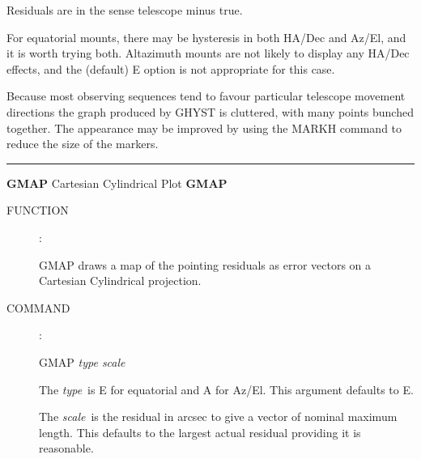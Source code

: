 \begin{description}
Residuals are in the sense telescope minus true.

For equatorial mounts, there may be hysteresis in both HA/Dec
and Az/El, and it is worth trying both.  Altazimuth mounts
are not likely to display any HA/Dec effects, and the (default)
E option is not appropriate for this case.

Because most observing sequences tend to favour particular
telescope movement directions the graph produced by GHYST is
cluttered, with many points bunched together.  The appearance
may be improved by using the MARKH command to reduce the size
of the markers.

\end{description}


\goodbreak
\rule{\textwidth}{0.3mm}
{\Large {\bf GMAP} \hfill Cartesian Cylindrical Plot \hfill {\bf GMAP}}
\begin{description}
\item [FUNCTION]:

GMAP draws a map of the pointing residuals as
error vectors on a Cartesian Cylindrical projection.

\item [COMMAND]:

\begin{cmd}
\> \> GMAP {\it type scale}
\end{cmd}

The {\it type}\, is E for equatorial and A for Az/El.
This argument defaults to E.

The {\it scale}\, is the residual in arcsec to
give a vector of nominal maximum length.  This defaults
to the largest actual residual providing it is reasonable.

\end{description}



